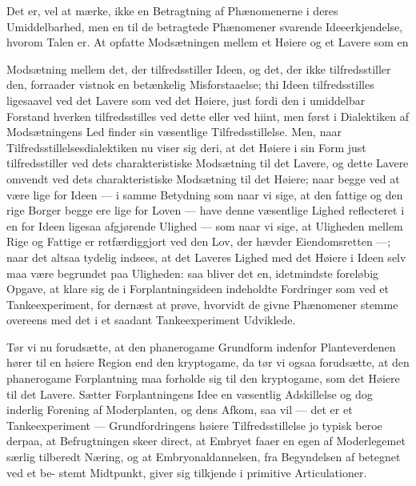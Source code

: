 \documentclass[12pt,a4paper]{book}
\begin{document}
Det er, vel at mærke, ikke en Betragtning af Phænomenerne i deres
Umiddelbarhed, men en til de betragtede Phænomener svarende
Ideeerkjendelse, hvorom Talen er. At opfatte Modsætningen mellem et
Høiere og et Lavere som en

Modsætning mellem det, der tilfredsstiller Ideen, og det, der ikke
tilfredsstiller den, forraader vistnok en betænkelig Misforstaaelse; thi
Ideen tilfredsstilles ligesaavel ved det Lavere som ved det Høiere, just
fordi den i umiddelbar Forstand hverken tilfredsstilles ved dette eller
ved hiint, men først i Dialektiken af Modsætningens Led finder sin
væsentlige Tilfredsstillelse. Men, naar Tilfredsstillelsesdialektiken nu
viser sig deri, at det Høiere i sin Form just tilfredsstiller ved dets
charakteristiske Modsætning til det Lavere, og dette Lavere omvendt ved
dets charakteristiske Modsætning til det Høiere; naar begge ved at være
lige for Ideen --- i samme Betydning som naar vi sige, at den fattige og
den rige Borger begge ere lige for Loven --- have denne væsentlige
Lighed reflecteret i en for Ideen ligesaa afgjørende Ulighed --- som
naar vi sige, at Uligheden mellem Rige og Fattige er retfærdiggjort ved
den Lov, der hævder Eiendomsretten ---; naar det altsaa tydelig indsees,
at det Laveres Lighed med det Høiere i Ideen selv maa være begrundet
paa Uligheden: saa bliver det en, idetmindste foreløbig Opgave, at klare
sig de i Forplantningsideen indeholdte Fordringer som ved et
Tankeexperiment, for dernæst at prøve, hvorvidt de givne Phænomener
stemme overeens med det i et saadant Tankeexperiment Udviklede.

Tør vi nu forudsætte, at den phanerogame Grundform indenfor
Planteverdenen hører til en høiere Region end den kryptogame, da tør vi
ogsaa forudsætte, at den phanerogame Forplantning maa forholde sig til
den kryptogame, som det Høiere til det Lavere. Sætter Forplantningens
Idee en væsentlig Adskillelse og dog inderlig Forening af Moderplanten,
og dens Afkom, saa vil --- det er et Tankeexperiment ---
Grundfordringens høiere Tilfredsstillelse jo typisk beroe derpaa, at
Befrugtningen skeer direct, at Embryet faaer en egen af Moderlegemet
særlig tilberedt Næring, og at Embryonaldannelsen, fra Begyndelsen af
betegnet ved et be-
\setcounter{footnote}{0}
stemt Midtpunkt, giver sig tilkjende i primitive Articulationer.
\end{document}
